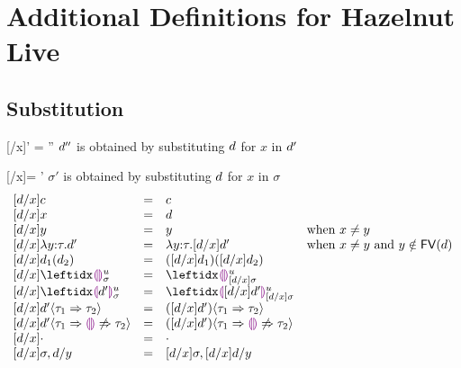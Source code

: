 
\newcommand{\additionalDefnsSec}{Additional Definitions for Hazelnut Live}
\section{\protect\additionalDefnsSec} %
\label{sec:additional-defns}

\subsection{Substitution}
\label{sec:substitution}
\judgbox
  {[\dexp/x]\dexp' = \dexp''}
  {$d''$ is obtained by substituting $d$ for $x$ in $d'$}

\vspace{5pt}
\judgbox
  {[\dexp/x]\sigma = \sigma'}
  {$\sigma'$ is obtained by substituting $d$ for $x$ in $\sigma$}
\[
\begin{array}{lcll}
\substitute{\dexp}{x}{c}
&=&
c\\
\substitute{\dexp}{x}{x}
&=&
\dexp
\\%
\substitute{\dexp}{x}{y}
&=&
y
& \text{when $x \neq y$}
\\
\substitute{\dexp}{x}{\halam{y}{\htau}{\dexp'}}
&=&
\halam{y}{\htau}{\substitute{\dexp}{x}{\dexp'}}
& \text{when $x \neq y$ and $y \notin \fvof{d}$}
\\
\substitute{\dexp}{x}{\dap{\dexp_1}{\dexp_2}}
&=&
\dap{(\substitute{\dexp}{x}{\dexp_1})}{\substitute{\dexp}{x}{\dexp_2}}
\\
\substitute{\dexp}{x}{\dehole{u}{\subst}{}}
&=&
\dehole{u}{\substitute{\dexp}{x}{\subst}}{}
\\
\substitute{\dexp}{x}{\dhole{\dexp'}{u}{\subst}{}}
&=&
\dhole{\substitute{\dexp}{x}{\dexp'}}{u}{\substitute{\dexp}{x}{\subst}}{}
\\
\substitute{\dexp}{x}{\dcasttwo{\dexp'}{\htau_1}{\htau_2}}
&=&
\dcasttwo{(\substitute{\dexp}{x}{\dexp'})}{\htau_1}{\htau_2}
\\
\substitute{\dexp}{x}{\dcastfail{\dexp'}{\htau_1}{\htau_2}}
&=&
\dcastfail{(\substitute{\dexp}{x}{\dexp'})}{\htau_1}{\htau_2}
\\
\substitute{\dexp}{x}{\cdot}
&=&
\cdot\\
\substitute{\dexp}{x}{\sigma, d/y}
&=&
\substitute{\dexp}{x}{\sigma}, \substitute{\dexp}{x}{d}/y
\end{array}
\]

